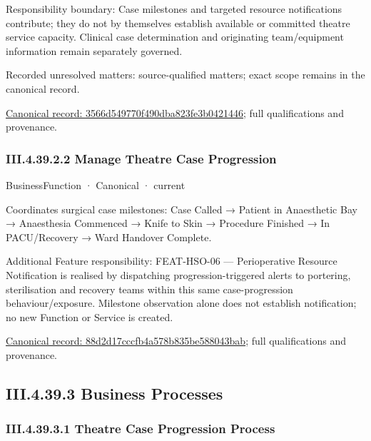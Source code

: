 Responsibility boundary: Case milestones and targeted resource notifications contribute; they do not by themselves establish available or committed theatre service capacity. Clinical case determination and originating team/equipment information remain separately governed.


{\small Recorded unresolved matters: source-qualified matters; exact scope remains in the canonical record.}\par
{\footnotesize \href{../../../../continuum/business/business-function/3566d549770f490dba823fe3b0421446.md}{Canonical record: 3566d549770f490dba823fe3b0421446}; full qualifications and provenance.}\par
\subsubsection*{III.4.39.2.2 Manage Theatre Case Progression}
\label{navigation:III.4.39.2.2}

\label{element:88d2d17cccfb4a578b835be588043bab}
{\small BusinessFunction · Canonical · current}\par

Coordinates surgical case milestones: Case Called → Patient in Anaesthetic Bay → Anaesthesia Commenced → Knife to Skin → Procedure Finished → In PACU/Recovery → Ward Handover Complete.



Additional Feature responsibility: FEAT-HSO-06 — Perioperative Resource Notification is realised by dispatching progression-triggered alerts to portering, sterilisation and recovery teams within this same case-progression behaviour/exposure. Milestone observation alone does not establish notification; no new Function or Service is created.


{\footnotesize \href{../../../../continuum/business/business-function/88d2d17cccfb4a578b835be588043bab.md}{Canonical record: 88d2d17cccfb4a578b835be588043bab}; full qualifications and provenance.}\par
\subsection*{III.4.39.3 Business Processes}
\label{navigation:III.4.39.3}

\subsubsection*{III.4.39.3.1 Theatre Case Progression Process}
\label{navigation:III.4.39.3.1}

